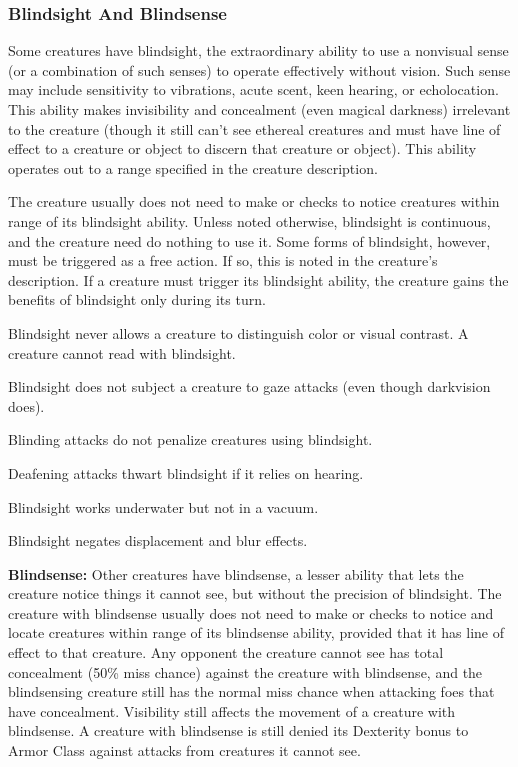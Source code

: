\subsubsection{Blindsight And Blindsense}
Some creatures have blindsight, the extraordinary ability to use a nonvisual sense (or a combination of such senses) to operate effectively without vision. Such sense may include sensitivity to vibrations, acute scent, keen hearing, or echolocation. This ability makes invisibility and concealment (even magical darkness) irrelevant to the creature (though it still can't see ethereal creatures and must have line of effect to a creature or object to discern that creature or object). This ability operates out to a range specified in the creature description.

The creature usually does not need to make  or  checks to notice creatures within range of its blindsight ability. Unless noted otherwise, blindsight is continuous, and the creature need do nothing to use it. Some forms of blindsight, however, must be triggered as a free action. If so, this is noted in the creature's description. If a creature must trigger its blindsight ability, the creature gains the benefits of blindsight only during its turn.

\begin{itemize*}
\item Blindsight never allows a creature to distinguish color or visual contrast. A creature cannot read with blindsight.
\item Blindsight does not subject a creature to gaze attacks (even though darkvision does).
\item Blinding attacks do not penalize creatures using blindsight.
\item Deafening attacks thwart blindsight if it relies on hearing.
\item Blindsight works underwater but not in a vacuum.
\item Blindsight negates displacement and blur effects.
\end{itemize*}

\textbf{Blindsense:} Other creatures have blindsense, a lesser ability that lets the creature notice things it cannot see, but without the precision of blindsight. The creature with blindsense usually does not need to make  or  checks to notice and locate creatures within range of its blindsense ability, provided that it has line of effect to that creature. Any opponent the creature cannot see has total concealment (50\% miss chance) against the creature with blindsense, and the blindsensing creature still has the normal miss chance when attacking foes that have concealment. Visibility still affects the movement of a creature with blindsense. A creature with blindsense is still denied its Dexterity bonus to Armor Class against attacks from creatures it cannot see.

